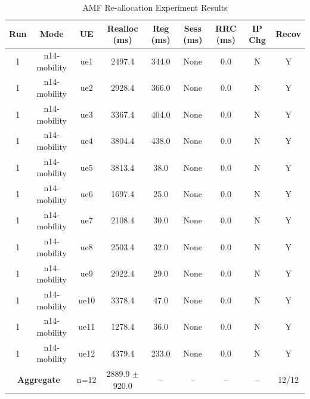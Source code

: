 \begin{table}[ht]
\centering
\begin{tabular}{|c|c|c|c|c|c|c|c|c|}
\hline
Run & Mode & UE & Realloc (ms) & Reg (ms) & Sess (ms) & RRC (ms) & IP Chg & Recov \\
\hline
1 & n14-mobility & ue1 & 2497.4 & 344.0 & None & 0.0 & N & Y \\
1 & n14-mobility & ue2 & 2928.4 & 366.0 & None & 0.0 & N & Y \\
1 & n14-mobility & ue3 & 3367.4 & 404.0 & None & 0.0 & N & Y \\
1 & n14-mobility & ue4 & 3804.4 & 438.0 & None & 0.0 & N & Y \\
1 & n14-mobility & ue5 & 3813.4 & 38.0 & None & 0.0 & N & Y \\
1 & n14-mobility & ue6 & 1697.4 & 25.0 & None & 0.0 & N & Y \\
1 & n14-mobility & ue7 & 2108.4 & 30.0 & None & 0.0 & N & Y \\
1 & n14-mobility & ue8 & 2503.4 & 32.0 & None & 0.0 & N & Y \\
1 & n14-mobility & ue9 & 2922.4 & 29.0 & None & 0.0 & N & Y \\
1 & n14-mobility & ue10 & 3378.4 & 47.0 & None & 0.0 & N & Y \\
1 & n14-mobility & ue11 & 1278.4 & 36.0 & None & 0.0 & N & Y \\
1 & n14-mobility & ue12 & 4379.4 & 233.0 & None & 0.0 & N & Y \\
\multicolumn{2}{|c|}{\textbf{Aggregate}} & n=12 & 2889.9 $\pm$ 920.0 & -- & -- & -- & -- & 12/12 \\
\hline
\end{tabular}
\caption{AMF Re-allocation Experiment Results}
\label{tab:amf_realloc}
\end{table}
